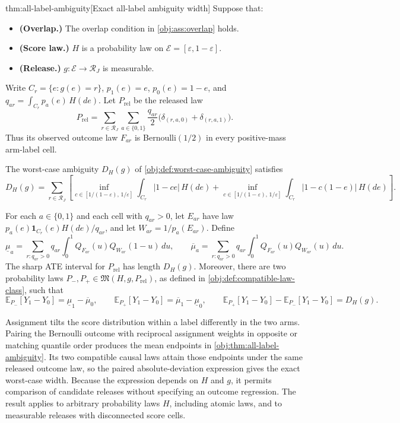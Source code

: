 \begin{theoremv}{thm:all-label-ambiguity}[Exact all-label ambiguity width]
Suppose that:
\begin{itemize}
\item \textbf{(Overlap.)} The overlap condition in \cref{obj:ass:overlap} holds.
\item \textbf{(Score law.)} \(H\) is a probability law on \(\mathcal E=[\varepsilon,1-\varepsilon]\).
\item \textbf{(Release.)} \(g:\mathcal E\to\mathcal R_J\) is measurable.
\end{itemize}
Write \(C_r=\{e:g(e)=r\}\), \(p_1(e)=e\), \(p_0(e)=1-e\), and \(q_{ar}=\int_{C_r}p_a(e)\,H(de)\). Let \(P_{\mathrm{rel}}\) be the released law
\[
P_{\mathrm{rel}}
=\sum_{r\in\mathcal R_J}\sum_{a\in\{0,1\}}
\frac{q_{ar}}{2}\bigl(\delta_{(r,a,0)}+\delta_{(r,a,1)}\bigr).
\]
Thus its observed outcome law \(F_{ar}\) is Bernoulli\((1/2)\) in every positive-mass arm-label cell.

The worst-case ambiguity \(D_H(g)\) of \cref{obj:def:worst-case-ambiguity} satisfies
\[
D_H(g)=
\sum_{r\in\mathcal R_J}
\left[
\inf_{c\in[1/(1-\varepsilon),\,1/\varepsilon]}
\int_{C_r}|1-ce|\,H(de)
+
\inf_{c\in[1/(1-\varepsilon),\,1/\varepsilon]}
\int_{C_r}|1-c(1-e)|\,H(de)
\right].
\]

For each \(a\in\{0,1\}\) and each cell with \(q_{ar}>0\), let \(E_{ar}\) have law \(p_a(e)\mathbf 1_{C_r}(e)H(de)/q_{ar}\), and let \(W_{ar}=1/p_a(E_{ar})\). Define
\[
\underline\mu_a
=\sum_{r:q_{ar}>0}q_{ar}\int_0^1
Q_{F_{ar}}(u)Q_{W_{ar}}(1-u)\,du,
\qquad
\overline\mu_a
=\sum_{r:q_{ar}>0}q_{ar}\int_0^1
Q_{F_{ar}}(u)Q_{W_{ar}}(u)\,du.
\]
The sharp ATE interval for \(P_{\mathrm{rel}}\) has length \(D_H(g)\). Moreover, there are two probability laws \(P_-,P_+\in\mathfrak M(H,g,P_{\mathrm{rel}})\), as defined in \cref{obj:def:compatible-law-class}, such that
\[
\mathbb E_{P_-}[Y_1-Y_0]=\underline\mu_1-\overline\mu_0,
\qquad
\mathbb E_{P_+}[Y_1-Y_0]=\overline\mu_1-\underline\mu_0,
\qquad
\mathbb E_{P_+}[Y_1-Y_0]-\mathbb E_{P_-}[Y_1-Y_0]=D_H(g).
\]
\end{theoremv}

Assignment tilts the score distribution within a label differently in the two arms. Pairing the Bernoulli outcome with reciprocal assignment weights in opposite or matching quantile order produces the mean endpoints in \cref{obj:thm:all-label-ambiguity}. Its two compatible causal laws attain those endpoints under the same released outcome law, so the paired absolute-deviation expression gives the exact worst-case width. Because the expression depends on \(H\) and \(g\), it permits comparison of candidate releases without specifying an outcome regression. The result applies to arbitrary probability laws \(H\), including atomic laws, and to measurable releases with disconnected score cells.

